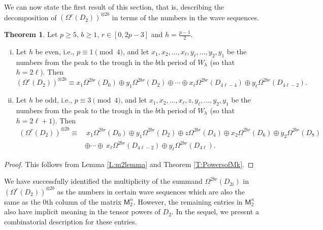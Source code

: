 \documentclass[12pt,reqno]{amsart}
\renewcommand{\geq}{\geqslant}
\newcommand{\M}{\mathsf{M}}
\theoremstyle{definition}
\newtheorem{thm}{Theorem}[section]
\numberwithin{equation}{section}
\begin{document}
We can now state the first result of this section, that is, describing the decomposition of $(\Omega^r(D_2))^{\otimes 2b}$ in terms of the numbers in the wave sequences. 

\begin{thm}
    Let $p\geq 5$, $b\geq 1$, $r\in [0,2p-3]$ and $h=\frac{p-1}{2}$. 
    \begin{enumerate}[(i)] 
        \item Let $h$ be even, i.e., $p\equiv 1\pmod 4$, and let $x_1,x_2,\ldots,x_\ell,y_\ell,\ldots,y_2,y_1$ be the numbers from the peak to the trough in the $b$th period of $W_h$ (so that $h=2\ell$). Then \[(\Omega^r(D_2))^{\otimes 2b}\equiv x_1\Omega^{2br}(D_0)\oplus y_1\Omega^{2br}(D_2)\oplus \cdots\oplus x_{\ell}\Omega^{2br}(D_{4\ell-4})\oplus y_{\ell}\Omega^{2br}(D_{4\ell-2}).\]
        
        \item  Let $h$ be odd, i.e., $p\equiv 3\pmod 4$, and let $x_1,x_2,\ldots,x_\ell,z,y_\ell,\ldots,y_2,y_1$ be the numbers from the peak to the trough in the $b$th period of $W_h$ (so that $h=2\ell+1$). Then 
            \begin{align*}
            (\Omega^r(D_2))^{\otimes 2b}\equiv & \ x_1\Omega^{2br}(D_0)\oplus y_1\Omega^{2br}(D_2)\oplus z\Omega^{2br}(D_4)\oplus x_2\Omega^{2br}(D_6)\oplus y_2\Omega^{2br}(D_8)\\ &\oplus \cdots\oplus 
            \ x_{\ell} \Omega^{2br}(D_{4\ell-2})\oplus y_\ell \Omega^{2br}(D_{4\ell}).
            \end{align*}
    \end{enumerate}
\end{thm}
\begin{proof}
    This follows from Lemma \ref{L:m2lemma} and Theorem \ref{T:PowersofMk}.
\end{proof}

We have successfully identified the multiplicity of the summand $\Omega^{2br}(D_{2i})$ in $(\Omega^r(D_2))^{\otimes 2b}$ as the numbers in certain wave sequences which are also the same as the $0$th column of the matrix $\M_2^n$. However, the remaining entries in $\M_2^n$ also have implicit meaning in the tensor powers of $D_2$. In the sequel, we present a combinatorial description for these entries. 
\end{document}
